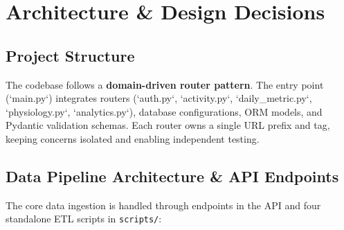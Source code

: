 \documentclass[10pt,a4paper]{article}
\begin{document}
\section{Architecture \& Design Decisions}

\subsection{Project Structure}

The codebase follows a \textbf{domain-driven router pattern}. The entry point (`main.py`) integrates routers (`auth.py`, `activity.py`, `daily\_metric.py`, `physiology.py`, `analytics.py`), database configurations, ORM models, and Pydantic validation schemas. Each router owns a single URL prefix and tag, keeping concerns isolated and enabling independent testing.

\subsection{Data Pipeline Architecture \& API Endpoints}

The core data ingestion is handled through endpoints in the API and four standalone ETL scripts in \texttt{scripts/}:
\end{document}
